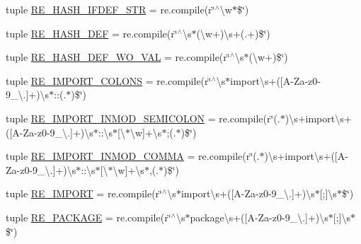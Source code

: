 \begin{DoxyCompactItemize}
\item 
tuple \hyperlink{namespacesrc_1_1regex_aa29208a089924b6ca6de77d0ce260a38}{R\-E\-\_\-\-H\-A\-S\-H\-\_\-\-I\-F\-D\-E\-F\-\_\-\-S\-T\-R} = re.\-compile(r\char`\"{}$^\wedge$\textbackslash{}w$\ast$\$\char`\"{})
\item 
tuple \hyperlink{namespacesrc_1_1regex_aedef0b43e8edc555d38d4c10fbacf5f7}{R\-E\-\_\-\-H\-A\-S\-H\-\_\-\-D\-E\-F} = re.\-compile(r\char`\"{}$^\wedge$\textbackslash{}s$\ast$(\textbackslash{}w+)\textbackslash{}s+(.+)\$\char`\"{})
\item 
tuple \hyperlink{namespacesrc_1_1regex_a2c971b22dfac3f240df57813857aeefd}{R\-E\-\_\-\-H\-A\-S\-H\-\_\-\-D\-E\-F\-\_\-\-W\-O\-\_\-\-V\-A\-L} = re.\-compile(r\char`\"{}$^\wedge$\textbackslash{}s$\ast$(\textbackslash{}w+)\$\char`\"{})
\item 
tuple \hyperlink{namespacesrc_1_1regex_a2c55bd8387e44744536b42a10eb31ac7}{R\-E\-\_\-\-I\-M\-P\-O\-R\-T\-\_\-\-C\-O\-L\-O\-N\-S} = re.\-compile(r\char`\"{}$^\wedge$\textbackslash{}s$\ast$import\textbackslash{}s+(\mbox{[}A-\/Za-\/z0-\/9\-\_\-\textbackslash{}.\mbox{]}+)\textbackslash{}s$\ast$\-::(.$\ast$)\$\char`\"{})
\item 
tuple \hyperlink{namespacesrc_1_1regex_aaed56bef8d30504e8c3dcbc460113bb4}{R\-E\-\_\-\-I\-M\-P\-O\-R\-T\-\_\-\-I\-N\-M\-O\-D\-\_\-\-S\-E\-M\-I\-C\-O\-L\-O\-N} = re.\-compile(r\char`\"{}(.$\ast$)\textbackslash{}s+import\textbackslash{}s+(\mbox{[}A-\/Za-\/z0-\/9\-\_\-\textbackslash{}.\mbox{]}+)\textbackslash{}s$\ast$\-::\textbackslash{}s$\ast$\mbox{[}\textbackslash{}$\ast$\textbackslash{}w\mbox{]}+\textbackslash{}s$\ast$;(.$\ast$)\$\char`\"{})
\item 
tuple \hyperlink{namespacesrc_1_1regex_a2e33bcc0db973deb34c30cfdb17ed1e2}{R\-E\-\_\-\-I\-M\-P\-O\-R\-T\-\_\-\-I\-N\-M\-O\-D\-\_\-\-C\-O\-M\-M\-A} = re.\-compile(r\char`\"{}(.$\ast$)\textbackslash{}s+import\textbackslash{}s+(\mbox{[}A-\/Za-\/z0-\/9\-\_\-\textbackslash{}.\mbox{]}+)\textbackslash{}s$\ast$\-::\textbackslash{}s$\ast$\mbox{[}\textbackslash{}$\ast$\textbackslash{}w\mbox{]}+\textbackslash{}s$\ast$,(.$\ast$)\$\char`\"{})
\item 
tuple \hyperlink{namespacesrc_1_1regex_a37e1bb1b20686d74fd1e8f3498c8a5cc}{R\-E\-\_\-\-I\-M\-P\-O\-R\-T} = re.\-compile(r\char`\"{}$^\wedge$\textbackslash{}s$\ast$import\textbackslash{}s+(\mbox{[}A-\/Za-\/z0-\/9\-\_\-\textbackslash{}.\mbox{]}+)\textbackslash{}s$\ast$\mbox{[};\mbox{]}\textbackslash{}s$\ast$\$\char`\"{})
\item 
tuple \hyperlink{namespacesrc_1_1regex_ab1fb0dbc4be0060e4bf4d304e273a9b7}{R\-E\-\_\-\-P\-A\-C\-K\-A\-G\-E} = re.\-compile(r\char`\"{}$^\wedge$\textbackslash{}s$\ast$package\textbackslash{}s+(\mbox{[}A-\/Za-\/z0-\/9\-\_\-\textbackslash{}.\mbox{]}+)\textbackslash{}s$\ast$\mbox{[};\mbox{]}\textbackslash{}s$\ast$\$\char`\"{})

\end{DoxyCompactItemize}
